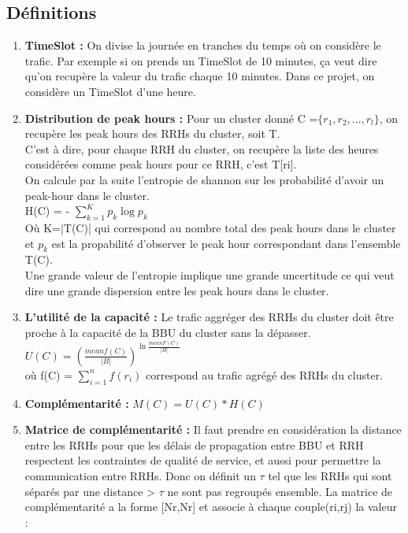 \documentclass{report}
\begin{document}
\subsection{Définitions}
\begin{enumerate}
  \item \textbf{TimeSlot :} On divise la journée en tranches du temps où on considère le trafic. Par exemple si on prends un TimeSlot 
  de 10 minutes, ça veut dire qu'on recupère la valeur du trafic chaque 10 minutes. Dans ce projet, on considère un TimeSlot d'une heure.
  \item \textbf{Distribution de peak hours :} Pour un cluster donné C =$\{r_{1},r_{2},...,r_{l}\}$, on recupère les peak hours des RRHs du cluster, soit T. \\
  C'est à dire, pour chaque RRH du cluster, on recupère la liste des heures considérées comme peak hours pour ce RRH, c'est T[ri].\\ 
  On calcule par la suite l'entropie de shannon sur les probabilité d'avoir un peak-hour dans le cluster.\\
  H(C) = - $\sum_{k=1}^{K}p_{k} \log p_{k}$ \\
  Où K=|T(C)| qui correspond au nombre total des peak hours dans le cluster et $p_{k}$ est la propabilité d'observer le peak hour correspondant dans l'ensemble T(C). \\
  Une grande valeur de l'entropie implique une grande uncertitude ce qui veut dire une grande dispersion entre 
  les peak hours dans le cluster.\\
  \item \textbf{L'utilité de la capacité :} Le trafic aggréger des RRHs du cluster doit être proche à la capacité de la BBU du cluster sans la dépasser.\\
  $U(C)= \left(\frac{meanf(C)}{|B|}\right)^{\ln\frac{meanF(C)}{|B|} }$ \\
  où f(C) = $\sum_{i=1}^{n}f(r_{i})$ correspond au trafic agrégé des RRHs du cluster.
  \item \textbf{Complémentarité :} $M(C) = U(C)*H(C)$
  \item \textbf{Matrice de complémentarité :} Il faut prendre en considération la distance entre les RRHs pour que les délais 
  de propagation entre BBU et RRH respectent les contraintes de qualité de service, et aussi pour permettre la communication 
  entre RRHs. Donc on définit un $\tau$ tel que les RRHs qui sont séparés par une distance > $\tau$ ne sont pas regroupés ensemble. 
  La matrice de complémentarité a la forme [Nr,Nr] et associe à chaque couple(ri,rj) la valeur :

\end{enumerate}
\end{document}
